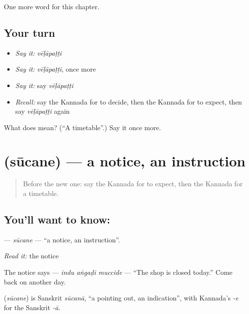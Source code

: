 \begin{grammarlens}[title={What you've built}]
One more word for this chapter.
\end{grammarlens}

\subsection*{Your turn}
\begin{itemize}
\raggedright
  \item \emph{Say it:} \emph{vēḷāpaṭṭi}
  \item \emph{Say it:} \emph{vēḷāpaṭṭi}, once more
  \item \emph{Say it:} say \emph{vēḷāpaṭṭi}
  \item \emph{Recall:} say the Kannada for to decide, then the Kannada for to expect, then say \emph{vēḷāpaṭṭi} again
\end{itemize}

\begin{tcolorbox}[breakable,colback=teal!4,colframe=teal!35!black,title={Before you move on}]
What does  mean? (\textquotedblleft{}A timetable\textquotedblright{}.) Say it once more.
\end{tcolorbox}
\section[\texorpdfstring{\kn{ಸೂಚನೆ} (sūcane)}{ಸೂಚನೆ (sūcane)}]{ (sūcane) — a notice, an instruction}

\label{lesson:KA-C157-suchane}



\begin{quote}
Before the new one: say the Kannada for to expect, then the Kannada for a timetable.
\end{quote}

\subsection*{You'll want to know: }
\textbf{} — \emph{sūcane} — \textquotedblleft{}a notice, an instruction\textquotedblright{}.

\emph{Read it:} the notice

The notice says \textbf{  } — \emph{indu aṅgaḍi muccide} — \textquotedblleft{}The shop is closed today.\textquotedblright{} Come back on another day.

\begin{cousinweb}
\textbf{} (\emph{sūcane}) is Sanskrit \emph{sūcanā}, \textquotedblleft{}a pointing out, an indication\textquotedblright{}, with Kannada's \emph{-e} for the Sanskrit \emph{-ā}.
\end{cousinweb}

